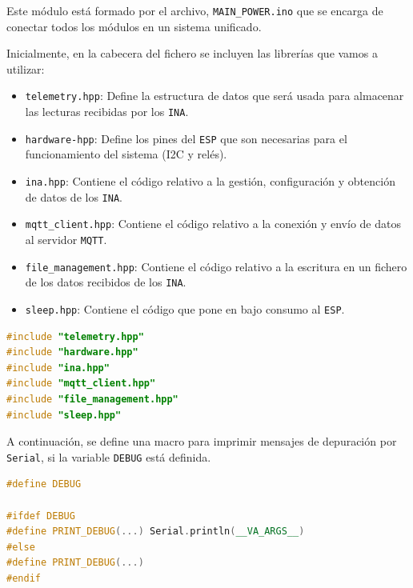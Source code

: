 Este módulo está formado por el archivo, \texttt{MAIN\_POWER.ino} que se encarga de conectar todos los módulos en un sistema unificado.

Inicialmente, en la cabecera del fichero se incluyen las librerías que vamos a utilizar:
\begin{itemize}
    \item \texttt{telemetry.hpp}: Define la estructura de datos que será usada para almacenar las lecturas recibidas por los \texttt{INA}.
    \item \texttt{hardware-hpp}: Define los pines del \texttt{ESP} que son necesarias para el funcionamiento del sistema (I2C y relés).
    \item \texttt{ina.hpp}: Contiene el código relativo a la gestión, configuración y obtención de datos de los \texttt{INA}. 
    \item \texttt{mqtt\_client.hpp}: Contiene el código relativo a la conexión y envío de datos al servidor \texttt{MQTT}.
    \item \texttt{file\_management.hpp}: Contiene el código relativo a la escritura en un fichero de los datos recibidos de los \texttt{INA}.
    \item \texttt{sleep.hpp}: Contiene el código que pone en bajo consumo al \texttt{ESP}.
\end{itemize}

\begin{lstlisting}[captionpos=b, caption={Cabecera con los módulos y ficheros utilizados}, language=c++]
#include "telemetry.hpp"
#include "hardware.hpp"
#include "ina.hpp"
#include "mqtt_client.hpp"
#include "file_management.hpp"
#include "sleep.hpp"
\end{lstlisting}

A continuación, se define una macro para imprimir mensajes de depuración por \texttt{Serial}, si la variable \texttt{DEBUG} está definida.
\begin{lstlisting}[captionpos=b, caption={Definición de la macro de depuración}, language=c++]
#define DEBUG

#ifdef DEBUG
#define PRINT_DEBUG(...) Serial.println(__VA_ARGS__)
#else
#define PRINT_DEBUG(...)
#endif    
\end{lstlisting}


